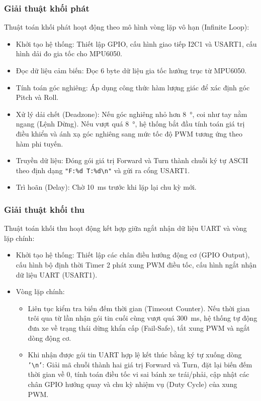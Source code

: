\subsubsection{Giải thuật khối phát}
Thuật toán khối phát hoạt động theo mô hình vòng lặp vô hạn (Infinite Loop):
\begin{itemize}
    \item Khởi tạo hệ thống: Thiết lập GPIO, cấu hình giao tiếp I2C1 và USART1, cấu hình dải đo gia tốc cho MPU6050.
    \item Đọc dữ liệu cảm biến: Đọc 6 byte dữ liệu gia tốc hướng trục từ MPU6050.
    \item Tính toán góc nghiêng: Áp dụng công thức hàm lượng giác để xác định góc Pitch và Roll.
    \item Xử lý dải chết (Deadzone): Nếu góc nghiêng nhỏ hơn \qty{8}{\degree}, coi như tay nằm ngang (Lệnh Dừng). Nếu vượt quá \qty{8}{\degree}, hệ thống bắt đầu tính toán giá trị điều khiển và ánh xạ góc nghiêng sang mức tốc độ PWM tương ứng theo hàm phi tuyến.
    \item Truyền dữ liệu: Đóng gói giá trị Forward và Turn thành chuỗi ký tự ASCII theo định dạng \texttt{"F:\%d T:\%d\textbackslash n"} và gửi ra cổng USART1.
    \item Trì hoãn (Delay): Chờ \qty{10}{\milli\second} trước khi lặp lại chu kỳ mới.
\end{itemize}

\subsubsection{Giải thuật khối thu}
Thuật toán khối thu hoạt động kết hợp giữa ngắt nhận dữ liệu UART và vòng lặp chính:
\begin{itemize}
    \item Khởi tạo hệ thống: Thiết lập các chân điều hướng động cơ (GPIO Output), cấu hình bộ định thời Timer 2 phát xung PWM điều tốc, cấu hình ngắt nhận dữ liệu UART (USART1).
    \item Vòng lặp chính:
    \begin{itemize}
        \item Liên tục kiểm tra biến đếm thời gian (Timeout Counter). Nếu thời gian trôi qua từ lần nhận gói tin cuối cùng vượt quá \qty{300}{\milli\second}, hệ thống tự động đưa xe về trạng thái dừng khẩn cấp (Fail-Safe), tắt xung PWM và ngắt dòng động cơ.
        \item Khi nhận được gói tin UART hợp lệ kết thúc bằng ký tự xuống dòng \texttt{'\textbackslash n'}: Giải mã chuỗi thành hai giá trị Forward và Turn, đặt lại biến đếm thời gian về 0, tính toán điều tốc vi sai bánh xe trái/phải, cập nhật các chân GPIO hướng quay và chu kỳ nhiệm vụ (Duty Cycle) của xung PWM.
    \end{itemize}
\end{itemize}


